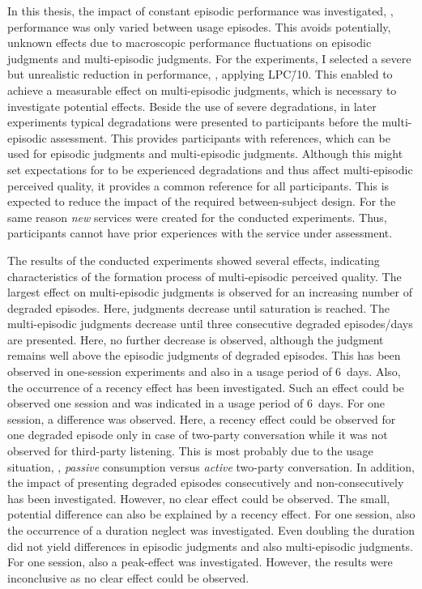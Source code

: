 In this thesis, the impact of constant episodic performance was investigated, \ie, performance was only varied between usage episodes.
This avoids potentially, unknown effects due to macroscopic performance fluctuations on episodic judgments and multi-episodic judgments.
For the experiments, I selected a severe but unrealistic reduction in performance, \ie, applying LPC\=/10.
This enabled to achieve a measurable effect on multi-episodic judgments, which is necessary to investigate potential effects.
Beside the use of severe degradations, in later experiments typical degradations were presented to participants before the multi-episodic assessment.
This provides participants with references, which can be used for episodic judgments and multi-episodic judgments.
Although this might set expectations for to be experienced degradations and thus affect multi-episodic perceived quality, it provides a common reference for all participants.
This is expected to reduce the impact of the required between-subject design.
For the same reason \emph{new} services were created for the conducted experiments.
Thus, participants cannot have prior experiences with the service under assessment.

The results of the conducted experiments showed several effects, indicating characteristics of the formation process of multi-episodic perceived quality.
The largest effect on multi-episodic judgments is observed for an increasing number of degraded episodes.
Here, judgments decrease until saturation is reached.
The multi-episodic judgments decrease until three consecutive degraded episodes/days are presented.
Here, no further decrease is observed, although the judgment remains well above the episodic judgments of degraded episodes.
This has been observed in one-session experiments and also in a usage period of 6~days.
Also, the occurrence of a recency effect has been investigated.
Such an effect could be observed one session and was indicated in a usage period of 6~days.
For one session, a difference was observed.
Here, a recency effect could be observed for one degraded episode only in case of two-party conversation while it was not observed for third-party listening.
This is most probably due to the usage situation, \ie, \emph{passive} consumption versus \emph{active} two-party conversation.
In addition, the impact of presenting degraded episodes consecutively and non-consecutively has been investigated.
However, no clear effect could be observed.
The small, potential difference can also be explained by a recency effect.
For one session, also the occurrence of a duration neglect was investigated.
Even doubling the duration did not yield differences in episodic judgments and also multi-episodic judgments.
For one session, also a peak-effect was investigated.
However, the results were inconclusive as no clear effect could be observed.

